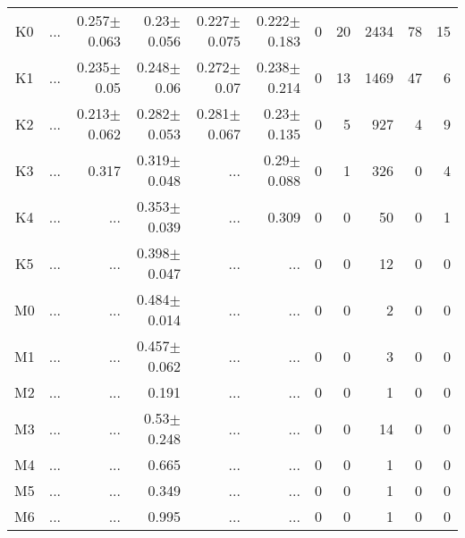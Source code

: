 \begin{table}[t]
\begin{center}
\begin{tabular}{c|rrrrr|rrrrr}
K0	&	 ...	&	0.257$\pm$0.063	&	0.23$\pm$0.056	&	0.227$\pm$0.075	&	0.222$\pm$0.183	&	0	&	20	&	2434	&	78	&	15	\\
K1	&	 ...	&	0.235$\pm$0.05	&	0.248$\pm$0.06	&	0.272$\pm$0.07	&	0.238$\pm$0.214	&	0	&	13	&	1469	&	47	&	6	\\
K2	&	 ...	&	0.213$\pm$0.062	&	0.282$\pm$0.053	&	0.281$\pm$0.067	&	0.23$\pm$0.135	&	0	&	5	&	927	&	4	&	9	\\
K3	&	 ...	&	0.317	&	0.319$\pm$0.048	&	 ...	&	0.29$\pm$0.088	&	0	&	1	&	326	&	0	&	4	\\
K4	&	 ...	&	 ...	&	0.353$\pm$0.039	&	 ...	&	0.309	&	0	&	0	&	50	&	0	&	1	\\
K5	&	 ...	&	 ...	&	0.398$\pm$0.047	&	 ...	&	 ...	&	0	&	0	&	12	&	0	&	0	\\
M0	&	 ...	&	 ...	&	0.484$\pm$0.014	&	 ...	&	 ...	&	0	&	0	&	2	&	0	&	0	\\
M1	&	 ...	&	 ...	&	0.457$\pm$0.062	&	 ...	&	 ...	&	0	&	0	&	3	&	0	&	0	\\
M2	&	 ...	&	 ...	&	0.191	&	 ...	&	 ...	&	0	&	0	&	1	&	0	&	0	\\
M3	&	 ...	&	 ...	&	0.53$\pm$0.248	&	 ...	&	 ...	&	0	&	0	&	14	&	0	&	0	\\
M4	&	 ...	&	 ...	&	0.665	&	 ...	&	 ...	&	0	&	0	&	1	&	0	&	0	\\
M5	&	 ...	&	 ...	&	0.349	&	 ...	&	 ...	&	0	&	0	&	1	&	0	&	0	\\
M6	&	 ...	&	 ...	&	0.995	&	 ...	&	 ...	&	0	&	0	&	1	&	0	&	0	\\
    \bottomrule
    \end{tabular}
\end{center}
\end{table}



